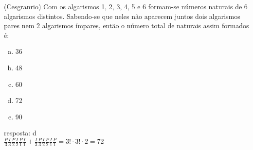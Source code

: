 \begin{ex}
 	 (Cesgranrio) Com os algarismos 1, 2, 3, 4, 5 e 6 formam-se números naturais de 6 algarismos distintos. Sabendo-se que neles não aparecem juntos dois algarismos pares nem 2 algarismos ímpares, então o número total de naturais assim formados é:
    \begin{enumerate}[(a)]
    \item 36
    \item 48
    \item 60
    \item 72
    \item 90
    \end{enumerate}
      \begin{sol}
        resposta: d \\
        $\frac{P}{3}\frac{I}{3}\frac{P}{2}\frac{I}{2}\frac{P}{1}\frac{I}{1}+\frac{I}{3}\frac{P}{3}\frac{I}{2}\frac{P}{2}\frac{I}{1}\frac{P}{1}= 3!\cdot3!\cdot2=72$
      \end{sol}
\end{ex}